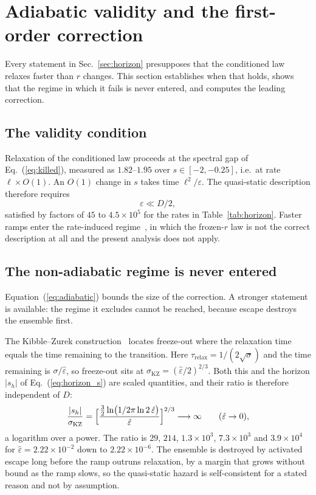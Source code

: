 \documentclass[%
 twocolumn,
 superscriptaddress,
 amsmath,amssymb,
 aps,
 pre,
 floatfix,
]{revtex4-2}
\newcommand{\Sig}{\hat\varepsilon}
\begin{document}
\section{\label{sec:lag}Adiabatic validity and the first-order correction}

Every statement in Sec.~\ref{sec:horizon} presupposes that the conditioned law relaxes faster than $r$ changes.  This section establishes when that holds, shows that the regime in which it fails is never entered, and computes the leading correction.

\subsection{The validity condition}

Relaxation of the conditioned law proceeds at the spectral gap of Eq.~(\ref{eq:killed}), measured as $1.82$--$1.95$ over $s\in[-2,-0.25]$, i.e.\ at rate $\ell\times O(1)$.  An $O(1)$ change in $s$ takes time $\ell^2/\varepsilon$.  The quasi-static description therefore requires
\begin{equation}
\label{eq:adiabatic}
\varepsilon\ll D/2,
\end{equation}
satisfied by factors of $45$ to $4.5\times10^{5}$ for the rates in Table~\ref{tab:horizon}.  Faster ramps enter the rate-induced regime~\cite{Ashwin2012,Ritchie2016,Alkhayuon2019}, in which the frozen-$r$ law is not the correct description at all and the present analysis does not apply.

\subsection{\label{sec:kz}The non-adiabatic regime is never entered}

Equation~(\ref{eq:adiabatic}) bounds the size of the correction.  A stronger statement is available: the regime it excludes cannot be reached, because escape destroys the ensemble first.

The Kibble--Zurek construction~\cite{Kibble1976,Zurek1985,delCampoZurek2014} locates freeze-out where the relaxation time equals the time remaining to the transition.  Here $\tau_{\mathrm{relax}}=1/(2\sqrt\sigma)$ and the time remaining is $\sigma/\Sig$, so freeze-out sits at $\sigma_{\mathrm{KZ}}=(\Sig/2)^{2/3}$.  Both this and the horizon $|s_h|$ of Eq.~(\ref{eq:horizon_s}) are scaled quantities, and their ratio is therefore independent of $D$:
\begin{equation}
\label{eq:kzratio}
\frac{|s_h|}{\sigma_{\mathrm{KZ}}}
=\Bigl[\frac{\tfrac32\ln\bigl(1/2\pi\ln2\,\Sig\bigr)}{\Sig}\Bigr]^{2/3}
\longrightarrow\infty
\qquad(\Sig\to0),
\end{equation}
a logarithm over a power.  The ratio is $29$, $214$, $1.3\times10^3$, $7.3\times10^3$ and $3.9\times10^4$ for $\Sig=2.22\times10^{-2}$ down to $2.22\times10^{-6}$.  The ensemble is destroyed by activated escape long before the ramp outruns relaxation, by a margin that grows without bound as the ramp slows, so the quasi-static hazard is self-consistent for a stated reason and not by assumption.
\end{document}
